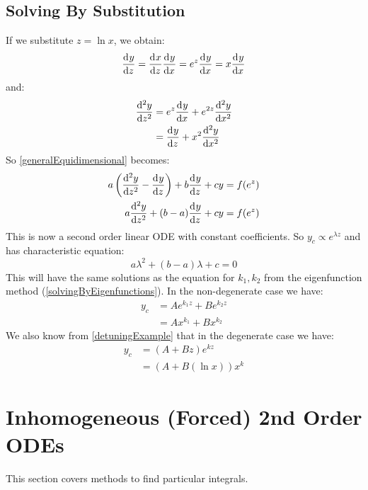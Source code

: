 \documentclass[../main.tex]{subfiles}
\begin{document}
\subsection{Solving By Substitution} \label{equidimensionalSub}
If we substitute $z = \ln x$, we obtain:
\[
  \deriv{y}{z} = \deriv{x}{z} \deriv{y}{x} = e^{z} \deriv{y}{x} = x \deriv{y}{x}
\]
and:
\begin{align*}
  \deriv[2]{y}{z} &= e^{z} \deriv{y}{x} + e^{2z} \deriv[2]{y}{x} \\
                  &= \deriv{y}{z} + x^2 \deriv[2]{y}{x}
\end{align*}
So \cref{generalEquidimensional} becomes:
\begin{align*}
  a\left(\deriv[2]{y}{z} - \deriv{y}{z}\right) + b \deriv{y}{z} + cy &= f(e^{z}) \\
  a \deriv[2]{y}{z} + (b - a)\deriv{y}{z} + cy &= f(e^{z})
\end{align*}
This is now a second order linear ODE with constant coefficients.
So $y_c \propto e^{\lambda z}$ and has characteristic equation:
\[
  a\lambda^2 + (b - a)\lambda + c = 0
\]
This will have the same solutions as the equation for $k_1, k_2$ from the eigenfunction method (\cref{solvingByEigenfunctions}).
In the non-degenerate case we have:
\begin{align*}
  y_c &= Ae^{k_1 z} + Be^{k_2 z} \\
      &= Ax^{k_1} + Bx^{k_2}
\end{align*}
We also know from \cref{detuningExample} that in the degenerate case we have:
\begin{align*}
  y_c &= (A + Bz)e^{kz} \\
      &= (A + B(\ln x))x^{k}
\end{align*}
\section{Inhomogeneous (Forced) 2nd Order ODEs}
This section covers methods to find particular integrals.
\end{document}
